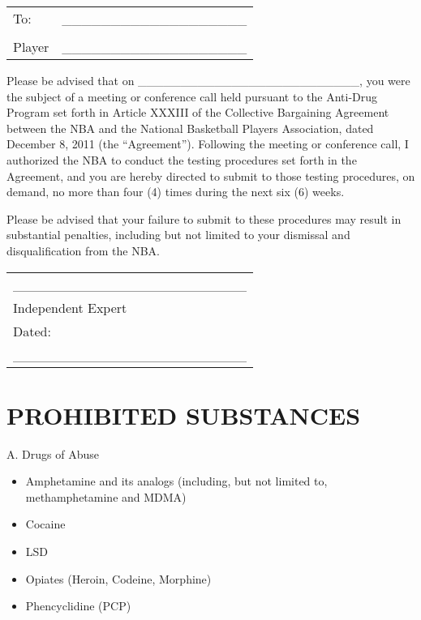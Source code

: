 \documentclass[
]{book}
\providecommand{\tightlist}{%
  \setlength{\itemsep}{0pt}\setlength{\parskip}{0pt}}
\begin{document}
\begin{longtable}[]{@{}lc@{}}
\toprule()
\endhead
To: & \_\_\_\_\_\_\_\_\_\_\_\_\_\_\_\_\_\_\_ \\
& \\
Player & \_\_\_\_\_\_\_\_\_\_\_\_\_\_\_\_\_\_\_ \\
\bottomrule()
\end{longtable}

Please be advised that on \_\_\_\_\_\_\_\_\_\_\_\_\_\_\_\_\_\_\_\_\_\_\_\_\_\_, you were the subject of a meeting or conference call held pursuant to the Anti-Drug Program set forth in Article XXXIII of the Collective Bargaining Agreement between the NBA and the National Basketball Players Association, dated December 8, 2011 (the ``Agreement''). Following the meeting or conference call, I authorized the NBA to conduct the testing procedures set forth in the Agreement, and you are hereby directed to submit to those testing procedures, on demand, no more than four (4) times during the next six (6) weeks.

Please be advised that your failure to submit to these procedures may result in substantial penalties, including but not limited to your dismissal and disqualification from the NBA.

\begin{longtable}[]{@{}l@{}}
\toprule()
\endhead
\_\_\_\_\_\_\_\_\_\_\_\_\_\_\_\_\_\_\_\_\_\_\_\_ \\
Independent Expert \\
Dated: \\
\_\_\_\_\_\_\_\_\_\_\_\_\_\_\_\_\_\_\_\_\_\_\_\_ \\
\bottomrule()
\end{longtable}

\hypertarget{prohibited-substances}{%
\section{PROHIBITED SUBSTANCES}\label{prohibited-substances}}

A. Drugs of Abuse

\begin{itemize}
\tightlist
\item
  Amphetamine and its analogs (including, but not limited to, methamphetamine and MDMA)
\item
  Cocaine
\item
  LSD
\item
  Opiates (Heroin, Codeine, Morphine)
\item
  Phencyclidine (PCP)
\end{itemize}
\end{document}
